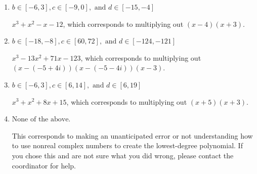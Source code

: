 \documentclass{extbook}[14pt]
\begin{document}
\begin{enumerate}
{\begin{enumerate}[label=\Alph*.]
* $x^{3} +13 x^{2} +71 x + 123$, which is the correct option.
\item \( b \in [-6, 3], c \in [-9, 0], \text{ and } d \in [-15, -4] \)

$x^{3} + x^{2} -x -12$, which corresponds to multiplying out $(x -4)(x + 3)$.
\item \( b \in [-18, -8], c \in [60, 72], \text{ and } d \in [-124, -121] \)

$x^{3} -13 x^{2} +71 x -123$, which corresponds to multiplying out $(x-(-5 + 4 i))(x-(-5 - 4 i))(x -3)$.
\item \( b \in [-6, 3], c \in [6, 14], \text{ and } d \in [6, 19] \)

$x^{3} + x^{2} +8 x + 15$, which corresponds to multiplying out $(x + 5)(x + 3)$.
\item \( \text{None of the above.} \)

This corresponds to making an unanticipated error or not understanding how to use nonreal complex numbers to create the lowest-degree polynomial. If you chose this and are not sure what you did wrong, please contact the coordinator for help.
\end{enumerate}

}
\end{enumerate}
\end{document}
